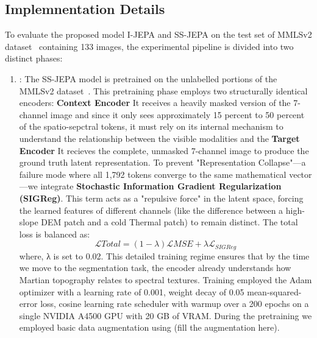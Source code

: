 \subsection{Implemnentation Details}
\label{sec:implementation}
To evaluate the proposed model I-JEPA and SS-JEPA on the test set of MMLSv2 dataset~\cite{mmlsv2_2026} containing 133 images, the experimental pipeline is divided into two distinct phases:
\begin{enumerate}
    \item {}: The SS-JEPA model is pretrained on the unlabelled portions of the MMLSv2 dataset~\cite{mmlsv2_2026}. This pretraining phase employs two structurally identical encoders: \textbf{Context Encoder} It receives a heavily masked version of the 7-channel image and since it only sees approximately 15 percent to 50 percent of the spatio-sepctral tokens, it must rely on its internal mechanism to understand the relationship between the visible modalities and the \textbf{Target Encoder} It recieves the complete, unmasked 7-channel image to produce the ground truth latent representation.
     To prevent "Representation Collapse"—a failure mode where all 1,792 tokens converge to the same mathematical vector—we integrate \textbf{Stochastic Information Gradient Regularization (SIGReg)}. This term acts as a "repulsive force" in the latent space, forcing the learned features of different channels (like the difference between a high-slope DEM patch and a cold Thermal patch) to remain distinct. The total loss is balanced as:
\begin{equation}
\mathcal{L}{Total} = (1 - \lambda)\mathcal{L}{MSE} + \lambda\mathcal{L}_{SIGReg}
\end{equation}
where, λ is set to 0.02. This detailed training regime ensures that by the time we move to the segmentation task, the encoder already understands how Martian topography relates to spectral textures. Training employed the Adam optimizer with a learning rate of 0.001, weight decay of 0.05 mean-squared-error loss, cosine learning rate scheduler with warmup over a 200 epochs on a single NVIDIA A4500 GPU with 20 GB of VRAM. During the pretraining we employed basic data augmentation using (fill the augmentation here).


\end{enumerate}
